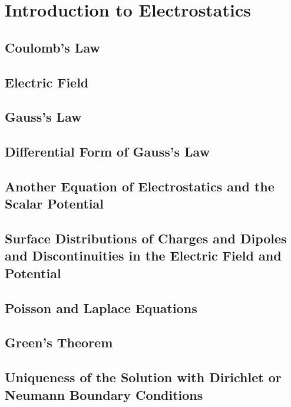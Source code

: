 \setcounter{chapter}{1}
\renewcommand{\thechapter}{2}
\chapter{Introduction to Electrostatics}
\setcounter{equation}{0}	        %

\section{Coulomb's Law}

\section{Electric Field}

\section{Gauss's Law}

\section{Differential Form of Gauss's Law}

\section{Another Equation of Electrostatics and the Scalar Potential}

\section{Surface Distributions of Charges and Dipoles and Discontinuities in the Electric Field and Potential}

\section{Poisson and Laplace Equations}

\section{Green's Theorem}

\section{Uniqueness of the Solution with Dirichlet or Neumann Boundary Conditions}

